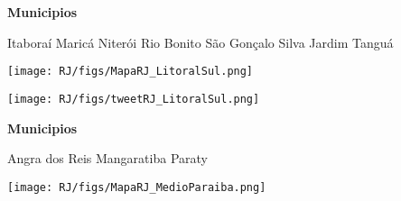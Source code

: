 \documentclass[10pt]{article} %
\begin{document}
\begin{minipage}[t]{.66\linewidth}
\end{minipage}\hfill\begin{minipage}[t]{.30\linewidth}
\begin{mdframed}[style=sidebar,frametitle={}]
\textbf{Municipios}\begin{itemize}\ysquare Itaboraí 
\ysquare Maricá 
\ysquare Niterói 
\ysquare Rio Bonito 
\ysquare São Gonçalo 
\wsquare Silva Jardim 
\ysquare Tanguá 
\end{itemize}\BackToContents\end{mdframed}\hfill\end{minipage}\newpage\begin{minipage}[t]{.66\linewidth}
\hypertarget{LtrS}{}
\texttt{[image: RJ/figs/MapaRJ\_LitoralSul.png]}\vspace{0.5cm}\begin{center}

\end{center}
\vspace{0.5cm}\begin{center}
\texttt{[image: RJ/figs/tweetRJ\_LitoralSul.png]}\end{center}
\end{minipage}\hfill\begin{minipage}[t]{.30\linewidth}
\begin{mdframed}[style=sidebar,frametitle={}]
\textbf{Municipios}\begin{itemize}\gsquare Angra dos Reis 
\wsquare Mangaratiba 
\gsquare Paraty 
\end{itemize}\BackToContents\end{mdframed}\hfill\end{minipage}\newpage\begin{minipage}[t]{.66\linewidth}
\hypertarget{MdPr}{}
\texttt{[image: RJ/figs/MapaRJ\_MedioParaiba.png]}\vspace{0.5cm}\begin{center}

\end{center}
\vspace{0.5cm}\begin{center}

\end{center}
\end{minipage}
\end{document}
